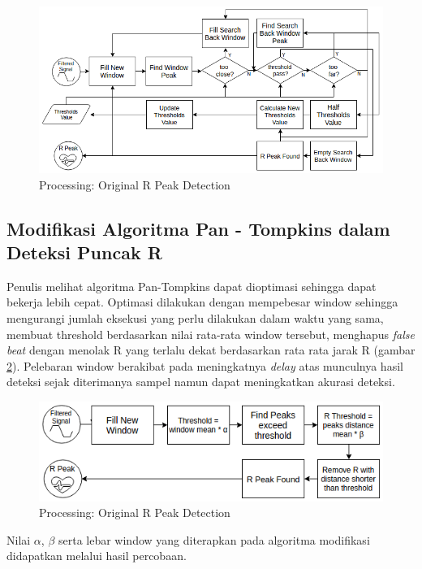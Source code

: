 \documentclass[]{indojc_single}
\begin{document}
\begin{figure}[htbp]
\centerline{\includegraphics[scale=0.6]{images/processing_ori.png}}
\caption{Processing: Original R Peak Detection}
\label{fig:processing_ori}
\end{figure}

\subsection{Modifikasi Algoritma Pan - Tompkins dalam Deteksi Puncak R}
Penulis melihat algoritma Pan-Tompkins dapat dioptimasi sehingga dapat bekerja lebih cepat. Optimasi dilakukan dengan mempebesar window sehingga mengurangi jumlah eksekusi yang perlu dilakukan dalam waktu yang sama, membuat threshold berdasarkan nilai rata-rata window tersebut, menghapus \textit{false beat} dengan menolak R yang terlalu dekat berdasarkan rata rata jarak R (gambar \ref{fig:processing_modif}). Pelebaran window berakibat pada meningkatnya \textit{delay} atas munculnya hasil deteksi sejak diterimanya sampel namun dapat meningkatkan akurasi deteksi.

\begin{figure}[htbp]
\centerline{\includegraphics[scale=0.65]{images/processing_modif.png}}
\caption{Processing: Original R Peak Detection}
\label{fig:processing_modif}
\end{figure}

Nilai $\alpha$, $\beta$ serta lebar window yang diterapkan pada algoritma modifikasi didapatkan melalui hasil percobaan.
\end{document}
